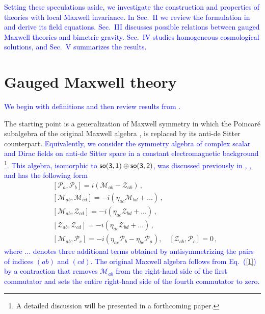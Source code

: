 \documentclass [prd,reprint,eqsecnum,nofootinbib]  {revtex4-1}
\newcommand{\lang}[1]{\textcolor{blue}{#1}}
\begin{document}
\lang{Setting these speculations aside, we investigate the
construction and properties of theories with local Maxwell
invariance. In Sec.~II we review the formulation in
\cite{Durka:2011nf} and derive its field equations. Sec.~III
discusses possible relations between gauged Maxwell theories and
bimetric gravity. Sec.~IV studies homogeneous cosmological solutions,
and Sec.~V summarizes the results.}

\section{Gauged Maxwell theory}

\lang{We begin with definitions and then review results from
\cite{Durka:2011nf}.}

The starting point is a generalization of Maxwell symmetry in which
the Poincar\'e subalgebra of the original Maxwell algebra
\cite{Bacry:1970ye}, \cite{Schrader:1972zd} is replaced by its
anti-de Sitter counterpart. \lang{Equivalently, we consider the
symmetry algebra of complex scalar and Dirac fields on anti-de Sitter
space in a constant electromagnetic background
\footnote{A detailed discussion will be presented in a forthcoming
paper.}. This algebra, isomorphic to
$\sf{so}(3,1)\oplus\sf{so}(3,2)$, was discussed previously in
\cite{Soroka:2006aj}, \cite{Bonanos:2010fw},
\cite{Lukierski:2010dy} and has the following form}
\cite{Durka:2011nf}
\begin{align}
&[\mathcal{P}_{a},\mathcal{P}_{b}]=i(\mathcal{M}_{ab}-\mathcal{Z}_{ab})\,
,\nonumber\\
&[\mathcal{M}_{ab},\mathcal{M}_{cd}]=-i(\eta_{ac}\mathcal{M}_{bd}+\ldots)\, ,\nonumber\\
&[\mathcal{M}_{ab},\mathcal{Z}_{cd}]=-i(\eta_{ac}\mathcal{Z}_{bd}+\ldots)\,,\nonumber\\
&[\mathcal{Z}_{ab},\mathcal{Z}_{cd}]=-i(\eta_{ac}\mathcal{Z}_{bd}+\ldots)\, ,\nonumber\\
&[\mathcal{M}_{ab},\mathcal{P}_c]=-i(\eta_{ac}\mathcal{P}_{b}-\eta_{bc}\mathcal{P}_{a}),\quad
[\mathcal{Z}_{ab},\mathcal{P}_{c}]=0\,,\label{1}
\end{align}
\lang{where $\ldots$ denotes three additional terms obtained by
antisymmetrizing the pairs of indices $(ab)$ and $(cd)$. The
original Maxwell algebra \cite{Soroka:2006aj,Bonanos:2010fw,
Lukierski:2010dy} follows from Eq.~(\ref{1}) by a contraction that
removes $\mathcal{M}_{ab}$ from the right-hand side of the first
commutator and sets the entire right-hand side of the fourth
commutator to zero.}
\end{document}
